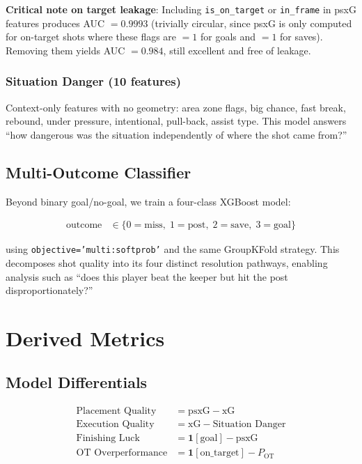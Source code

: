 \documentclass[12pt,a4paper]{article}
\begin{document}
\textbf{Critical note on target leakage}: Including \texttt{is\_on\_target} or \texttt{in\_frame} in psxG features produces AUC $= 0.9993$ (trivially circular, since psxG is only computed for on-target shots where these flags are $=1$ for goals and $=1$ for saves). Removing them yields AUC $= 0.984$, still excellent and free of leakage.

\subsubsection{Situation Danger (10 features)}

Context-only features with no geometry: area zone flags, big chance, fast break, rebound, under pressure, intentional, pull-back, assist type. This model answers ``how dangerous was the situation independently of where the shot came from?''

\subsection{Multi-Outcome Classifier}

Beyond binary goal/no-goal, we train a four-class XGBoost model:

\begin{align}
\text{outcome} &\in \{0=\text{miss},\; 1=\text{post},\; 2=\text{save},\; 3=\text{goal}\}
\end{align}

using \texttt{objective='multi:softprob'} and the same GroupKFold strategy. This decomposes shot quality into its four distinct resolution pathways, enabling analysis such as ``does this player beat the keeper but hit the post disproportionately?''

\section{Derived Metrics}
\label{sec:derived}

\subsection{Model Differentials}

\begin{align}
\text{Placement Quality} &= \text{psxG} - \text{xG} \label{eq:pq} \\[4pt]
\text{Execution Quality} &= \text{xG} - \text{Situation Danger} \label{eq:eq} \\[4pt]
\text{Finishing Luck} &= \mathbf{1}[\text{goal}] - \text{psxG} \label{eq:fl} \\[4pt]
\text{OT Overperformance} &= \mathbf{1}[\text{on\_target}] - P_{\text{OT}} \label{eq:ot}
\end{align}
\end{document}
